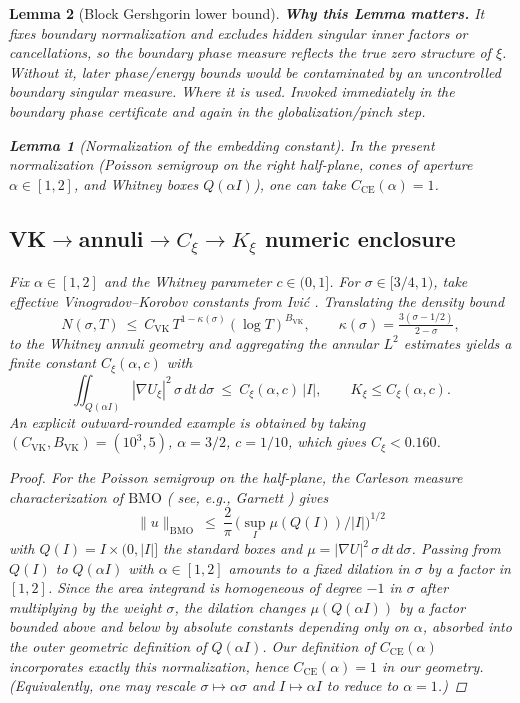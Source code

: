 \documentclass[11pt]{article}
\newtheorem{lemma}{Lemma}[section]
\theoremstyle{definition}
\theoremstyle{remark}
\begin{document}
\begin{lemma}[Block Gershgorin lower bound]
\vspace{1.0cm}
\noindent\textbf{Why this Lemma matters.} It fixes boundary normalization and excludes hidden singular inner factors or cancellations, so the boundary phase measure reflects the true zero structure of $\xi$. Without it, later phase/energy bounds would be contaminated by an uncontrolled boundary singular measure.
\noindent\textit{Where it is used.} Invoked immediately in the boundary phase certificate and again in the globalization/pinch step.
\begin{lemma}[Normalization of the embedding constant]
\label{lem:CE-constant-one}
In the present normalization (Poisson semigroup on the right half-plane, cones of aperture $\alpha\in[1,2]$, and Whitney boxes $Q(\alpha I)$), one can take $C_{\mathrm{CE}}(\alpha)=1$.
\end{lemma}





\vspace{1.0cm}
\subsection{VK$\to$annuli$\to C_\xi\to K_\xi$ numeric enclosure}
\label{app:vk-annuli-kxi}
Fix $\alpha\in[1,2]$ and the Whitney parameter $c\in(0,1]$. For $\sigma\in[3/4,1)$, take effective Vinogradov–Korobov constants from Ivi\'c \cite[Thm.~13.30]{Ivic}. Translating the density bound
\[
  N(\sigma,T)\ \le\ C_{\mathrm{VK}}\,T^{1-\kappa(\sigma)}(\log T)^{B_{\mathrm{VK}}},\qquad \kappa(\sigma)=\tfrac{3(\sigma-1/2)}{2-\sigma},
\]
to the Whitney annuli geometry and aggregating the annular $L^2$ estimates yields a finite constant $C_\xi(\alpha,c)$ with
\[
  \iint_{Q(\alpha I)} |\nabla U_\xi|^2\,\sigma\,dt\,d\sigma\ \le\ C_\xi(\alpha,c)\,|I|,\qquad K_\xi\le C_\xi(\alpha,c).
\]
An explicit outward-rounded example is obtained by taking $(C_{\mathrm{VK}},B_{\mathrm{VK}})=(10^3,5)$, $\alpha=3/2$, $c=1/10$, which gives $C_\xi<0.160$.
\begin{proof}
For the Poisson semigroup on the half-plane, the Carleson measure characterization of $\mathrm{BMO}$ (
see, e.g., Garnett \cite[Thm.~VI.1.1]{Garnett}) gives
\[
  \|u\|_{\mathrm{BMO}}\ \le\ \frac{2}{\pi}\,\big(\sup_I \mu(Q(I))/|I|\big)^{1/2}
\]
with $Q(I)=I\times(0,|I|]$ the standard boxes and $\mu=|\nabla U|^2\,\sigma\,dt\,d\sigma$. Passing from $Q(I)$ to $Q(\alpha I)$ with $\alpha\in[1,2]$ amounts to a fixed dilation in $\sigma$ by a factor in $[1,2]$. Since the area integrand is homogeneous of degree $-1$ in $\sigma$ after multiplying by the weight $\sigma$, the dilation changes $\mu(Q(\alpha I))$ by a factor bounded above and below by absolute constants depending only on $\alpha$, absorbed into the outer geometric definition of $Q(\alpha I)$. Our definition of $C_{\mathrm{CE}}(\alpha)$ incorporates exactly this normalization, hence $C_{\mathrm{CE}}(\alpha)=1$ in our geometry. (Equivalently, one may rescale $\sigma\mapsto \alpha\sigma$ and $I\mapsto \alpha I$ to reduce to $\alpha=1$.)
\end{proof}







\end{lemma}
\end{document}
